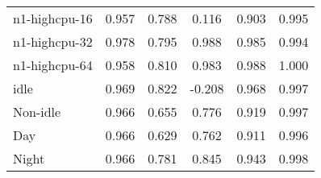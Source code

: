 \begin{table}[]
\begin{tabular}{lccccc}
n1-highcpu-16                                    & 0.957                                   & 0.788                           & 0.116                                & 0.903                                                                                    & 0.995                                                                             \\
n1-highcpu-32                                    & 0.978                                   & 0.795                           & 0.988                                & 0.985                                                                                    & 0.994                                                                             \\
n1-highcpu-64                                    & 0.958                                   & 0.810                           & 0.983                                & 0.988                                                                                    & 1.000                                                                             \\
idle                                             & 0.969                                   & 0.822                           & -0.208                               & 0.968                                                                                    & 0.997                                                                             \\
Non-idle                                         & 0.966                                   & 0.655                           & 0.776                                & 0.919                                                                                    & 0.997                                                                             \\
Day                                              & 0.966                                   & 0.629                           & 0.762                                & 0.911                                                                                    & 0.996                                                                             \\
Night                                            & 0.966                                   & 0.781                           & 0.845                                & 0.943                                                                                    & 0.998                                                                             \\

\end{tabular}
\end{table}
